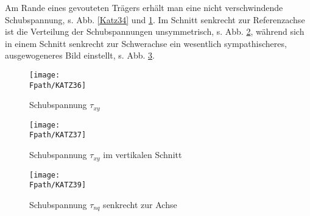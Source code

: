 Am Rande eines gevouteten Tr\"{a}gers erh\"{a}lt man eine nicht verschwindende Schubspannung, s. Abb. \ref{Katz34} und \ref{Katz36}. Im Schnitt senkrecht zur Referenzachse ist die Verteilung der Schubspannungen unsymmetrisch, s. Abb. \ref{Katz37}, w\"{a}hrend sich in einem Schnitt senkrecht zur Schwerachse ein wesentlich sympathischeres, ausgewogeneres Bild einstellt, s. Abb. \ref{Katz39}.
\begin{figure}[tbp] \centering
\if {} \sidecaption \fi
\texttt{[image: \\Fpath/KATZ36]}
\caption{Schubspannung $\tau_{xy}$}
\label{Katz36}%
\end{figure}%
\begin{figure}[tbp] \centering
\if {} \sidecaption \fi
\texttt{[image: \\Fpath/KATZ37]}
\caption{Schubspannung $\tau_{xy}$ im vertikalen Schnitt}
\label{Katz37}%
\end{figure}%

\begin{figure}[tbp] \centering
\if {} \sidecaption \fi
\texttt{[image: \\Fpath/KATZ39]}
\caption{Schubspannung $\tau_{nq}$ senkrecht zur Achse}
\label{Katz39}%
\end{figure}%
 
